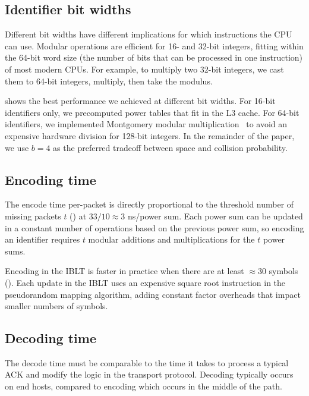 

\subsection{Identifier bit widths}
\label{sec:quack:microbenchmarks:bit-widths}

Different bit widths have different implications for
which instructions the CPU can use. Modular operations are efficient
for 16- and 32-bit integers, fitting within the 64-bit word size (the number of
bits that can be processed in one instruction) of most modern CPUs. For example,
to multiply two 32-bit integers, we cast them to 64-bit integers, multiply,
then take the modulus.

 shows the best performance we achieved at different bit
widths. For 16-bit identifiers only, we precomputed power tables that fit in
the L3 cache. For 64-bit identifiers, we implemented Montgomery modular
multiplication~\cite{montgomery1985modular} to avoid an expensive hardware
division for 128-bit integers. In the remainder of the paper, we use $b=4$ as
the preferred tradeoff between space and collision probability.

\subsection{Encoding time}
\label{sec:quack:microbenchmarks:encoding}

The encode time per-packet is directly proportional to
the threshold number of missing packets $t$ () at
$33/10 \approx 3$ ns/power sum.
Each power sum can be updated in a constant number of operations based on the
previous power sum, so encoding an identifier requires $t$ modular additions
and multiplications for the $t$ power sums.

Encoding in the IBLT is faster in practice when there are at least
$\approx\!30$ symbols ().
Each update in the IBLT uses an expensive square root instruction in the
pseudorandom mapping algorithm, adding constant factor overheads that impact
smaller numbers of symbols.

\subsection{Decoding time}
\label{sec:quack:microbenchmarks:decoding}

The decode time must be comparable to the time it takes to process a typical
ACK and modify the logic in the transport protocol. Decoding typically
occurs on end hosts, compared to encoding which occurs in the middle of the path.

